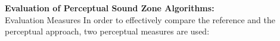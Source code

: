 \documentclass[aspectratio=169]{beamer}
\renewcommand{\cite}[1]{\footnote<.->[frame]{\fullcite{#1}}}
\begin{document}
\begin{frame}{\textbf{Evaluation of Perceptual Sound Zone Algorithms:}\\ Evaluation Measures}
    In order to effectively compare the reference and the perceptual approach, two perceptual measures are used:\\
    \vspace{10pt}
\end{frame}
\end{document}

